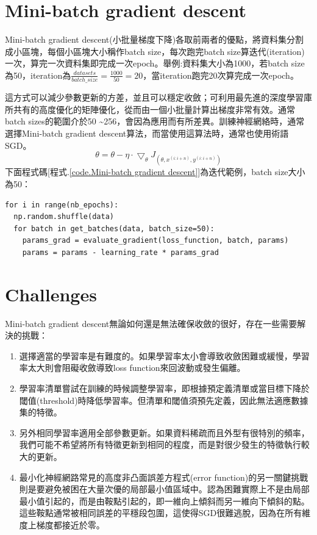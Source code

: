 \documentclass[13pt, a4paper]{report}
\begin{document}
\section{Mini-batch gradient descent}
Mini-batch gradient descent(小批量梯度下降)各取前兩者的優點，將資料集分割成小區塊，每個小區塊大小稱作batch size，每次跑完batch size算迭代(iteration)一次，算完一次資料集即完成一次epoch。舉例:資料集大小為1000，若batch size為50，iteration為$\frac{datasets}{batch\_size}=\frac{1000}{50}=20$，當iteration跑完20次算完成一次epoch。

這方式可以減少參數更新的方差，並且可以穩定收斂；可利用最先進的深度學習庫所共有的高度優化的矩陣優化，從而由一個小批量計算出梯度非常有效。通常batch sizes的範圍介於50 \textasciitilde 256，會因為應用而有所差異。訓練神經網絡時，通常選擇Mini-batch gradient descent算法，而當使用這算法時，通常也使用術語SGD。
$$\theta=\theta-\eta\cdot\bigtriangledown_{\theta}J_{(\theta, x^{(i:i+n)}, y^{(i:i+n)})}$$
下面程式碼[程式.\ref{code.Mini-batch gradient descent}]為迭代範例，batch size大小為50：
\begin{center}
\begin{lstlisting}[caption=Mini-batch gradient descent]
for i in range(nb_epochs):
  np.random.shuffle(data)
  for batch in get_batches(data, batch_size=50):
    params_grad = evaluate_gradient(loss_function, batch, params)
    params = params - learning_rate * params_grad
\end{lstlisting}
\label{code.Mini-batch gradient descent}
\end{center}
\section{Challenges}
Mini-batch gradient descent無論如何還是無法確保收斂的很好，存在一些需要解決的挑戰：
\begin{enumerate}
\item 選擇適當的學習率是有難度的。如果學習率太小會導致收斂困難或緩慢，學習率太大則會阻礙收斂導致loss function來回波動或發生偏離。
\item 學習率清單嘗試在訓練的時候調整學習率，即根據預定義清單或當目標下降於閾值(threshold)時降低學習率。但清單和閾值須預先定義，因此無法適應數據集的特徵。
\item 另外相同學習率適用全部參數更新。如果資料稀疏而且外型有很特別的頻率，我們可能不希望將所有特徵更新到相同的程度，而是對很少發生的特徵執行較大的更新。
\item 最小化神經網路常見的高度非凸面誤差方程式(error function)的另一關鍵挑戰則是要避免被困在大量次優的局部最小值區域中。認為困難實際上不是由局部最小值引起的，而是由鞍點引起的，即一維向上傾斜而另一維向下傾斜的點。這些鞍點通常被相同誤差的平穩段包圍，這使得SGD很難逃脫，因為在所有維度上梯度都接近於零。
\setcounter{enumii_saved}{\value{enumii}}
\end{enumerate}
\end{document}
